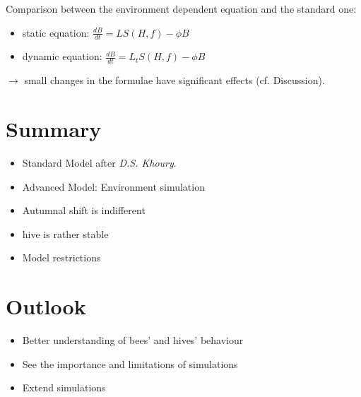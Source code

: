 \documentclass[
paper=128mm:96mm, %
fontsize=11pt, %
pagesize, %
parskip=half-, %
]{scrartcl} %
\theoremstyle{mythmstyle} %
\begin{document}
\clearpage


Comparison between the environment dependent equation and the standard one: 

\begin{itemize}
\item static equation: $	\frac{dB}{dt} = LS(H,f)-\phi B $
\item dynamic equation: $\frac{dB}{dt} = L_tS(H,f)-\phi B$
\end{itemize}

$\longrightarrow$ small changes in the formulae have significant effects (cf. Discussion).
 
\clearpage

\section{Summary}
\begin{itemize}
	\item Standard Model after \textit{D.S. Khoury}.
	\item Advanced Model: Environment simulation
	\item Autumnal shift is indifferent
	\item hive is rather stable
	\item Model restrictions
\end{itemize}
\clearpage

\section{Outlook}
\begin{itemize}
	\item Better understanding of bees' and hives' behaviour
	\item See the importance and limitations of simulations
	\item Extend simulations
\end{itemize}
\clearpage




\end{document}
